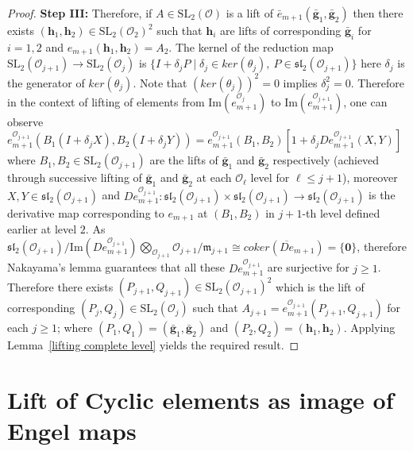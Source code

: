 \documentclass[10pt,twoside]{amsart}
\newcommand{\SL}{\mathrm{SL}}
\newcommand{\im}{\mathrm{Im}}
\theoremstyle{definition}
\theoremstyle{definition}
\begin{document}
\begin{proof}
{\bf Step III:} Therefore, if $A\in \SL_2(\mathcal{O})$ is a lift of $\bar e_{m+1}(\mathbf{\bar g}_1, \mathbf{\bar g}_2)$ then there exists $(\mathbf{h}_1, \mathbf{h}_2)\in \SL_2(\mathcal{O}_2)^2$ such that $\mathbf{h}_i$ are lifts of corresponding $\mathbf{\bar g}_i$ for $i=1,2$ and  $e_{m+1}(\mathbf{h}_1, \mathbf{h}_2) = A_2$. The kernel of the reduction map $\SL_2(\mathcal{O}_{j+1}) \rightarrow \SL_2(\mathcal{O}_j)$ is $\{I + \delta_j P \mid  \delta_j\in ker (\theta_j), \ P\in \mathfrak{sl}_2(\mathcal{O}_{j+1})\}$ here $\delta_j$ is the generator of $ker(\theta_j)$. Note that $(ker(\theta_j))^2=0$ implies $\delta_j^2=0$. Therefore in the context of lifting of elements from $\im(e_{m+1}^{\mathcal{O}_j})$ to $\im(e_{m+1}^{\mathcal{O}_{j+1}})$, one can observe $e_{m+1}^{\mathcal{O}_{j+1}}(B_1(I + \delta_jX), B_2(I + \delta_jY)) = e_{m+1}^{\mathcal{O}_{j+1}}(B_1, B_2)[1 + \delta_j De_{m+1}^{\mathcal{O}_{j+1}}(X, Y)]$ where $B_1, B_2\in \SL_2(\mathcal{O}_{j+1})$ are the lifts of $\mathbf{\bar g}_1$ and $\mathbf{\bar g}_2$ respectively (achieved through successive lifting of $\mathbf{\bar g}_1$ and $\mathbf{\bar g}_2$ at each $\mathcal{O}_{\ell}$ level for $\ell \leq j+1$), moreover $X, Y\in \mathfrak{sl}_2(\mathcal{O}_{j+1})$ and $De_{m+1}^{\mathcal{O}_{j+1}}\colon  \mathfrak{sl}_2(\mathcal{O}_{j+1}) \times \mathfrak{sl}_2(\mathcal{O}_{j+1}) \rightarrow \mathfrak{sl}_2( \mathcal{O}_{j+1}) $ is the derivative map corresponding to $e_{m+1}$ at $(B_1, B_2)$ in $j+1$-th level defined earlier at level $2$. As $\mathfrak{sl}_2(\mathcal{O}_{j+1})/ \im(De^{\mathcal{O}_{j+1}}_{m+1})\bigotimes_{\mathcal{O}_{j+1}}\mathcal{O}_{j+1}/\mathfrak{m}_{j+1}\cong coker(\overline{De}_{m+1}) = \{\mathbf{0}\}$, therefore Nakayama's lemma \cite{Atiyahmacdonald} guarantees that all these $De_{m+1}^{\mathcal{O}_{j+1}}$ are surjective for $j\geq 1$. Therefore there exists $(P_{j+1}, Q_{j+1})\in \SL_2(\mathcal{O}_{j+1})^2$ which is the lift of corresponding $(P_j, Q_j)\in \SL_2(\mathcal{O}_j)$ such that $A_{j+1} = e_{m+1}^{\mathcal{O}_{j+1}}(P_{j+1}, Q_{j+1})$ for each $j\geq 1$; where $(P_1, Q_1) = (\mathbf{\bar g}_1, \mathbf{\bar g}_2)$ and $(P_2, Q_2)=(\mathbf{h}_1, \mathbf{h}_2)$. Applying Lemma~\ref{lifting complete level} yields the required result. 
\end{proof}



\section{Lift of Cyclic elements as image of Engel maps}{\label{cyclic as Engel}}
\end{document}
